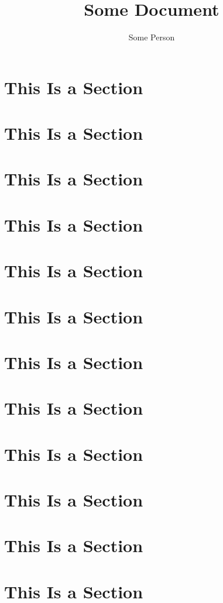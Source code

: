 \documentclass[a4paper,oneside,11pt]{article}
\title{Some Document}
\author{Some Person}
\begin{document}
\maketitle
\tableofcontents
\section{This Is a Section}
\lipsum[1-10]
\section{This Is a Section}
\lipsum[11-20]
\section{This Is a Section}
\lipsum[21-30]
\section{This Is a Section}
\lipsum[31-40]
\section{This Is a Section}
\lipsum[41-50]
\section{This Is a Section}
\lipsum[51-60]
\section{This Is a Section}
\lipsum[61-70]
\section{This Is a Section}
\lipsum[71-80]
\section{This Is a Section}
\lipsum[81-90]
\section{This Is a Section}
\lipsum[91-100]
\section{This Is a Section}
\lipsum[101-110]
\section{This Is a Section}
\lipsum[111-120]
\end{document}
